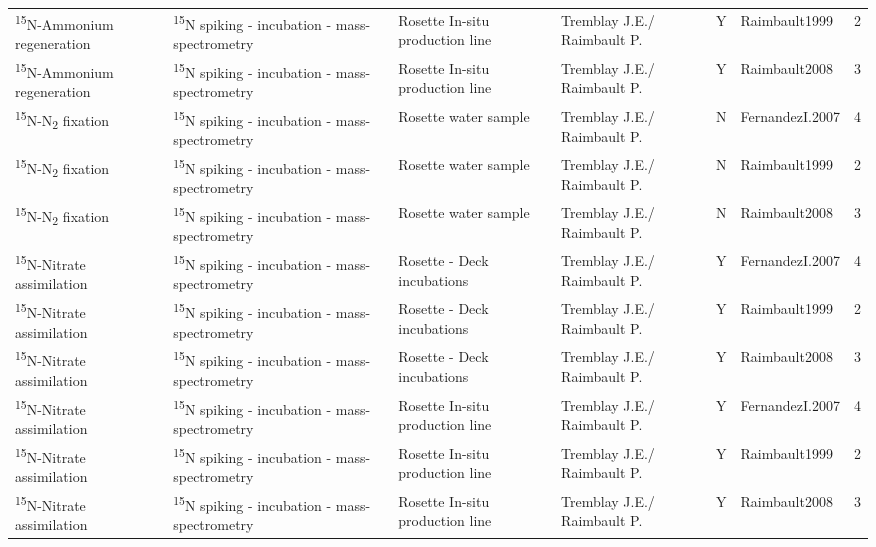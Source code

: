 \begin{ThreePartTable}
\begin{longtable}[t]{lllllll}
\textsuperscript{15}N-Ammonium regeneration & \textsuperscript{15}N spiking - incubation - mass-spectrometry & Rosette In-situ production line & Tremblay J.E./ Raimbault P. & Y & Raimbault1999 & 2\\
\textsuperscript{15}N-Ammonium regeneration & \textsuperscript{15}N spiking - incubation - mass-spectrometry & Rosette In-situ production line & Tremblay J.E./ Raimbault P. & Y & Raimbault2008 & 3\\
\addlinespace
\textsuperscript{15}N-N\textsubscript{2} fixation & \textsuperscript{15}N spiking - incubation - mass-spectrometry & Rosette water sample & Tremblay J.E./ Raimbault P. & N & FernandezI.2007 & 4\\
\textsuperscript{15}N-N\textsubscript{2} fixation & \textsuperscript{15}N spiking - incubation - mass-spectrometry & Rosette water sample & Tremblay J.E./ Raimbault P. & N & Raimbault1999 & 2\\
\textsuperscript{15}N-N\textsubscript{2} fixation & \textsuperscript{15}N spiking - incubation - mass-spectrometry & Rosette water sample & Tremblay J.E./ Raimbault P. & N & Raimbault2008 & 3\\
\textsuperscript{15}N-Nitrate assimilation & \textsuperscript{15}N spiking - incubation - mass-spectrometry & Rosette - Deck incubations & Tremblay J.E./ Raimbault P. & Y & FernandezI.2007 & 4\\
\textsuperscript{15}N-Nitrate assimilation & \textsuperscript{15}N spiking - incubation - mass-spectrometry & Rosette - Deck incubations & Tremblay J.E./ Raimbault P. & Y & Raimbault1999 & 2\\
\addlinespace
\textsuperscript{15}N-Nitrate assimilation & \textsuperscript{15}N spiking - incubation - mass-spectrometry & Rosette - Deck incubations & Tremblay J.E./ Raimbault P. & Y & Raimbault2008 & 3\\
\textsuperscript{15}N-Nitrate assimilation & \textsuperscript{15}N spiking - incubation - mass-spectrometry & Rosette In-situ production line & Tremblay J.E./ Raimbault P. & Y & FernandezI.2007 & 4\\
\textsuperscript{15}N-Nitrate assimilation & \textsuperscript{15}N spiking - incubation - mass-spectrometry & Rosette In-situ production line & Tremblay J.E./ Raimbault P. & Y & Raimbault1999 & 2\\
\textsuperscript{15}N-Nitrate assimilation & \textsuperscript{15}N spiking - incubation - mass-spectrometry & Rosette In-situ production line & Tremblay J.E./ Raimbault P. & Y & Raimbault2008 & 3\\

\end{longtable}
\end{ThreePartTable}
